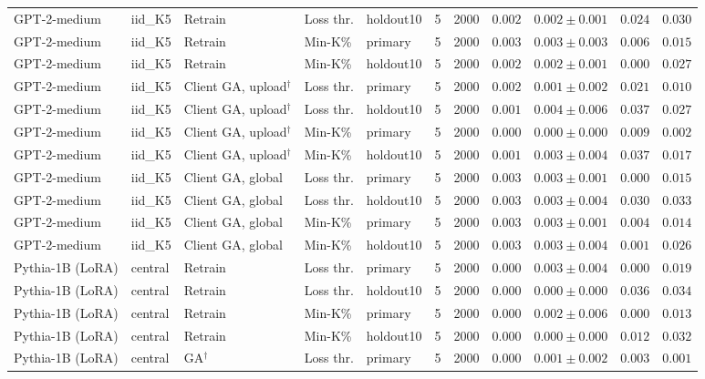 \begin{table}[t]
\begin{tabular*}{\textwidth}{@{\extracolsep{\fill}}lllllcccccc@{}}
GPT-2-medium & iid\_K5 & Retrain & Loss thr. & holdout10 & 5 & 2000 & $0.002$ & $0.002 \pm 0.001$ & $0.024$ & $0.030$ \\
GPT-2-medium & iid\_K5 & Retrain & Min-K\% & primary & 5 & 2000 & $0.003$ & $0.003 \pm 0.003$ & $0.006$ & $0.015$ \\
GPT-2-medium & iid\_K5 & Retrain & Min-K\% & holdout10 & 5 & 2000 & $0.002$ & $0.002 \pm 0.001$ & $0.000$ & $0.027$ \\
GPT-2-medium & iid\_K5 & Client GA, upload$^{\dagger}$ & Loss thr. & primary & 5 & 2000 & $0.002$ & $0.001 \pm 0.002$ & $0.021$ & $0.010$ \\
GPT-2-medium & iid\_K5 & Client GA, upload$^{\dagger}$ & Loss thr. & holdout10 & 5 & 2000 & $0.001$ & $0.004 \pm 0.006$ & $0.037$ & $0.027$ \\
GPT-2-medium & iid\_K5 & Client GA, upload$^{\dagger}$ & Min-K\% & primary & 5 & 2000 & $0.000$ & $0.000 \pm 0.000$ & $0.009$ & $0.002$ \\
GPT-2-medium & iid\_K5 & Client GA, upload$^{\dagger}$ & Min-K\% & holdout10 & 5 & 2000 & $0.001$ & $0.003 \pm 0.004$ & $0.037$ & $0.017$ \\
GPT-2-medium & iid\_K5 & Client GA, global & Loss thr. & primary & 5 & 2000 & $0.003$ & $0.003 \pm 0.001$ & $0.000$ & $0.015$ \\
GPT-2-medium & iid\_K5 & Client GA, global & Loss thr. & holdout10 & 5 & 2000 & $0.003$ & $0.003 \pm 0.004$ & $0.030$ & $0.033$ \\
GPT-2-medium & iid\_K5 & Client GA, global & Min-K\% & primary & 5 & 2000 & $0.003$ & $0.003 \pm 0.001$ & $0.004$ & $0.014$ \\
GPT-2-medium & iid\_K5 & Client GA, global & Min-K\% & holdout10 & 5 & 2000 & $0.003$ & $0.003 \pm 0.004$ & $0.001$ & $0.026$ \\
Pythia-1B (LoRA) & central & Retrain & Loss thr. & primary & 5 & 2000 & $0.000$ & $0.003 \pm 0.004$ & $0.000$ & $0.019$ \\
Pythia-1B (LoRA) & central & Retrain & Loss thr. & holdout10 & 5 & 2000 & $0.000$ & $0.000 \pm 0.000$ & $0.036$ & $0.034$ \\
Pythia-1B (LoRA) & central & Retrain & Min-K\% & primary & 5 & 2000 & $0.000$ & $0.002 \pm 0.006$ & $0.000$ & $0.013$ \\
Pythia-1B (LoRA) & central & Retrain & Min-K\% & holdout10 & 5 & 2000 & $0.000$ & $0.000 \pm 0.000$ & $0.012$ & $0.032$ \\
Pythia-1B (LoRA) & central & GA$^{\dagger}$ & Loss thr. & primary & 5 & 2000 & $0.000$ & $0.001 \pm 0.002$ & $0.003$ & $0.001$ \\

\end{tabular*}
\end{table}
